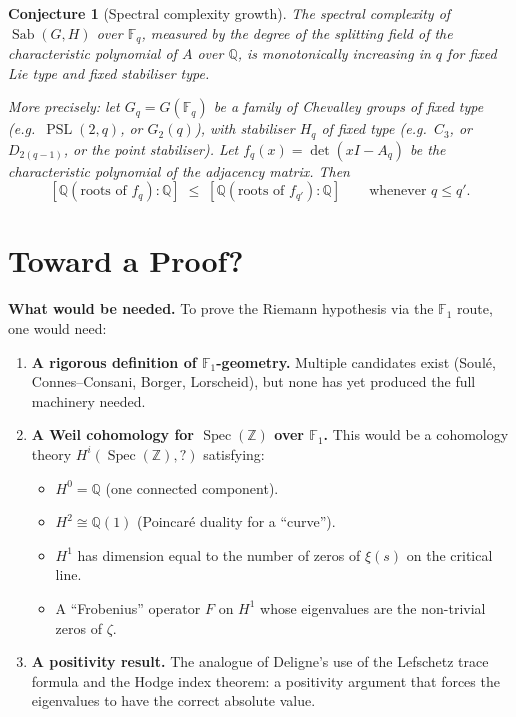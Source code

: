\documentclass[11pt,a4paper]{article}
\theoremstyle{plain}
\newtheorem{conjecture}[theorem]{Conjecture}
\theoremstyle{definition}
\newcommand{\Z}{\mathbb{Z}}
\newcommand{\Q}{\mathbb{Q}}
\newcommand{\F}{\mathbb{F}}
\newcommand{\Sab}{\operatorname{Sab}}
\newcommand{\PSL}{\operatorname{PSL}}
\newcommand{\Spec}{\operatorname{Spec}}
\begin{document}
\begin{tcolorbox}[colback=blue!8, colframe=blue!8,
  boxrule=0pt, sharp corners]
\begin{conjecture}[Spectral complexity growth]
\label{conj:complexity}
The spectral complexity of $\Sab(G, H)$ over $\F_q$, measured by the
degree of the splitting field of the characteristic polynomial of $A$
over $\Q$, is monotonically increasing in $q$ for fixed Lie type and
fixed stabiliser type.

More precisely: let $G_q = G(\F_q)$ be a family of Chevalley groups
of fixed type (e.g.\ $\PSL(2,q)$, or $G_2(q)$), with stabiliser
$H_q$ of fixed type (e.g.\ $C_3$, or $D_{2(q-1)}$, or the point
stabiliser). Let $f_q(x) = \det(xI - A_q)$ be the characteristic
polynomial of the adjacency matrix. Then
\[
  [\Q(\text{roots of } f_q) : \Q]
  \;\leq\;
  [\Q(\text{roots of } f_{q'}) : \Q]
  \qquad \text{whenever } q \leq q'.
\]
\end{conjecture}
\end{tcolorbox}


\section{Toward a Proof?}
\label{sec:toward}

\begin{tcolorbox}[breakable, colback=black!5, colframe=black!5,
  boxrule=0pt, sharp corners]
\textbf{What would be needed.}
To prove the Riemann hypothesis via the $\F_1$ route, one would need:

\begin{enumerate}
\item \textbf{A rigorous definition of $\F_1$-geometry.}
Multiple candidates exist (Soul\'e, Connes--Consani, Borger,
Lorscheid), but none has yet produced the full machinery needed.

\item \textbf{A Weil cohomology for $\Spec(\Z)$ over $\F_1$.}
This would be a cohomology theory $H^i(\Spec(\Z), ?)$ satisfying:
\begin{itemize}
\item $H^0 = \Q$ (one connected component).
\item $H^2 \cong \Q(1)$ (Poincar\'e duality for a ``curve'').
\item $H^1$ has dimension equal to the number of zeros of $\xi(s)$
  on the critical line.
\item A ``Frobenius'' operator $F$ on $H^1$ whose eigenvalues are
  the non-trivial zeros of $\zeta$.
\end{itemize}

\item \textbf{A positivity result.}
The analogue of Deligne's use of the Lefschetz trace formula and the
Hodge index theorem: a positivity argument that forces the
eigenvalues to have the correct absolute value.
\end{enumerate}
\end{tcolorbox}
\end{document}
